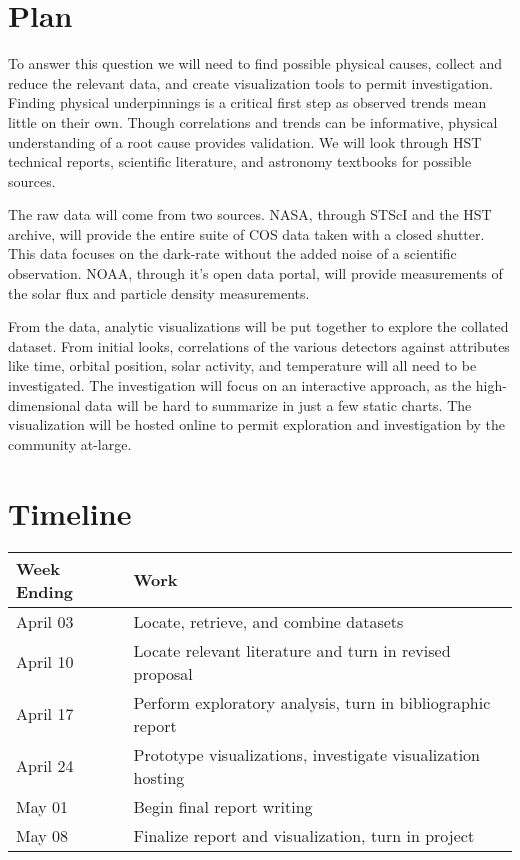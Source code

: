 \documentclass[a4paper,11pt]{article}
\begin{document}
\section{Plan}
To answer this question we will need to find possible physical causes, collect and reduce the relevant data, and create visualization tools to permit investigation.  Finding physical underpinnings is a critical first step as observed trends mean little on their own.  Though correlations and trends can be informative, physical understanding of a root cause provides validation.  We will look through HST technical reports, scientific literature, and astronomy textbooks for possible sources. 

The raw data will come from two sources.  NASA, through STScI and the HST archive, will provide the entire suite of COS data taken with a closed shutter.  This data focuses on the dark-rate without the added noise of a scientific observation.  NOAA, through it's open data portal, will provide measurements of the solar flux and particle density measurements.  

From the data, analytic visualizations will be put together to explore the collated dataset.  From initial looks, correlations of the various detectors against attributes like time, orbital position, solar activity, and temperature will all need to be investigated.  The investigation will focus on an interactive approach, as the high-dimensional data will be hard to summarize in just a few static charts.  The visualization will be hosted online to permit exploration and investigation by the community at-large.

\section{Timeline}

\begin{center}
\begin{tabular}{| l | l | }
  \hline	
      Week Ending & Work  \\  \hline \hline
      April 03 &  Locate, retrieve, and combine datasets \\ \hline
      April 10 &  Locate relevant literature and turn in revised proposal \\ \hline
      April 17 &  Perform exploratory analysis, turn in bibliographic report \\ \hline
      April 24 &  Prototype visualizations, investigate visualization hosting \\ \hline
      May 01 &  Begin final report writing  \\ \hline
      May 08 &  Finalize report and visualization, turn in project\\ \hline
\end{tabular} \\
\end{center}

\end{document}
